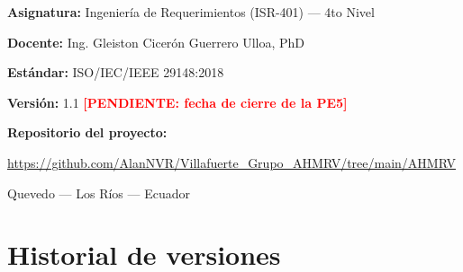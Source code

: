\documentclass[11pt,a4paper]{article}
\newcommand{\pendienteERS}[1]{\textcolor{red}{\textbf{[PENDIENTE: #1]}}}
\begin{document}
\begin{titlepage}
\vspace{0.9cm}
{\bfseries Asignatura:} Ingeniería de Requerimientos (ISR-401) --- 4to Nivel\par
{\bfseries Docente:} Ing. Gleiston Cicerón Guerrero Ulloa, PhD\par
{\bfseries Estándar:} ISO/IEC/IEEE 29148:2018\par
{\bfseries Versión:} 1.1  \pendienteERS{fecha de cierre de la PE5}\par

\vspace{0.8cm}
{\bfseries Repositorio del proyecto:}\par
\url{https://github.com/AlanNVR/Villafuerte_Grupo_AHMRV/tree/main/AHMRV}

\vfill
{\small Quevedo --- Los Ríos --- Ecuador\par}
\end{titlepage}

\section*{Historial de versiones}
\end{document}
